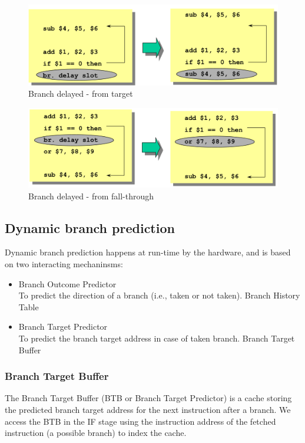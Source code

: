 \begin{figure}[h]
    \centering
    \includegraphics[scale = 0.4]{images/branch-delayed-from-target}
    \caption{Branch delayed - from target}
    \label{fig:branch-delayed-from-target}
\end{figure}

\begin{figure}[h]
    \centering
    \includegraphics[scale = 0.4]{images/branch-delayed-from-fall-through}
    \caption{Branch delayed - from fall-through}
    \label{fig:branch-delayed-from-fall-through}
\end{figure}


\subsection{Dynamic branch prediction}\label{subsec:dynamic-branch-prediction}
Dynamic branch prediction happens at run-time by the hardware, and is based on two interacting mechaninsms:
\begin{itemize}
    \item Branch Outcome Predictor\\
    To predict the direction of a branch (i.e., taken or not taken).
    \subitem Branch History Table
    \item Branch Target Predictor\\
    To predict the branch target address in case of taken branch.
    \subitem Branch Target Buffer
\end{itemize}

\subsubsection{Branch Target Buffer}
The Branch Target Buffer (BTB or Branch Target Predictor) is a cache storing the predicted branch target address
for the next instruction after a branch.
We access the BTB in the IF stage using the instruction address of the fetched instruction (a possible branch) to
index the cache.

